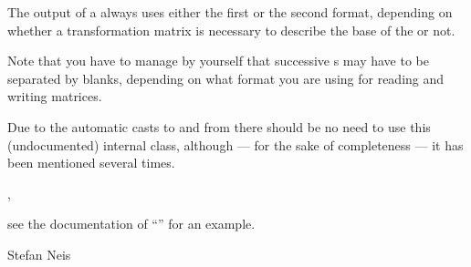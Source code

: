 The output of a  always uses either the first or the second format, depending
on whether a transformation matrix is necessary to describe the base of the 
or not.

Note that you have to manage by yourself that successive s may have to be separated
by blanks, depending on what format you are using for reading and writing matrices.



\NOTES

Due to the automatic casts to and from  there should be no need to use this
(undocumented) internal class, although --- for the sake of completeness --- it has been
mentioned several times.



\SEEALSO

, 



\EXAMPLES

see the documentation of ``'' for an example.



\AUTHOR

Stefan Neis
